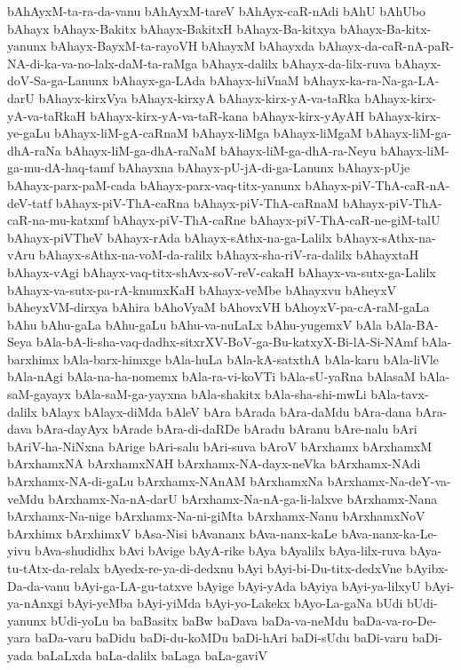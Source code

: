 {bAhAyxM-ta-ra-da-vanu
bAhAyxM-tareV
bAhAyx-caR-nAdi
bAhU
bAhUbo
bAhayx
bAhayx-Bakitx
bAhayx-BakitxH
bAhayx-Ba-kitxya
bAhayx-Ba-kitx-yanunx
bAhayx-BayxM-ta-rayoVH
bAhayxM
bAhayxda
bAhayx-da-caR-nA-paR-NA-di-ka-va-no-lalx-daM-ta-raMga
bAhayx-dalilx
bAhayx-da-lilx-ruva
bAhayx-doV-Sa-ga-Lanunx
bAhayx-ga-LAda
bAhayx-hiVnaM
bAhayx-ka-ra-Na-ga-LA-darU
bAhayx-kirxVya
bAhayx-kirxyA
bAhayx-kirx-yA-va-taRka
bAhayx-kirx-yA-va-taRkaH
bAhayx-kirx-yA-va-taR-kana
bAhayx-kirx-yAyAH
bAhayx-kirx-ye-gaLu
bAhayx-liM-gA-caRnaM
bAhayx-liMga
bAhayx-liMgaM
bAhayx-liM-ga-dhA-raNa
bAhayx-liM-ga-dhA-raNaM
bAhayx-liM-ga-dhA-ra-Neyu
bAhayx-liM-ga-mu-dA-haq-tamf
bAhayxna
bAhayx-pU-jA-di-ga-Lanunx
bAhayx-pUje
bAhayx-parx-paM-cada
bAhayx-parx-vaq-titx-yanunx
bAhayx-piV-ThA-caR-nA-deV-tatf
bAhayx-piV-ThA-caRna
bAhayx-piV-ThA-caRnaM
bAhayx-piV-ThA-caR-na-mu-katxmf
bAhayx-piV-ThA-caRne
bAhayx-piV-ThA-caR-ne-giM-talU
bAhayx-piVTheV
bAhayx-rAda
bAhayx-sAthx-na-ga-Lalilx
bAhayx-sAthx-na-vAru
bAhayx-sAthx-na-voM-da-ralilx
bAhayx-sha-riV-ra-dalilx
bAhayxtaH
bAhayx-vAgi
bAhayx-vaq-titx-shAvx-soV-reV-cakaH
bAhayx-va-sutx-ga-Lalilx
bAhayx-va-sutx-pa-rA-knumxKaH
bAhayx-veMbe
bAhayxvu
bAheyxV
bAheyxVM-dirxya
bAhira
bAhoVyaM
bAhovxVH
bAhoyxV-pa-cA-raM-gaLa
bAhu
bAhu-gaLa
bAhu-gaLu
bAhu-va-nuLaLx
bAhu-yugemxV
bAla
bAla-BA-Seya
bAla-bA-li-sha-vaq-dadhx-sitxrXV-BoV-ga-Bu-katxyX-Bi-lA-Si-NAmf
bAla-barxhimx
bAla-barx-himxge
bAla-huLa
bAla-kA-satxthA
bAla-karu
bAla-liVle
bAla-nAgi
bAla-na-ha-nomemx
bAla-ra-vi-koVTi
bAla-sU-yaRna
bAlasaM
bAla-saM-gayayx
bAla-saM-ga-yayxna
bAla-shakitx
bAla-sha-shi-mwLi
bAla-tavx-dalilx
bAlayx
bAlayx-diMda
bAleV
bAra
bArada
bAra-daMdu
bAra-dana
bAra-dava
bAra-dayAyx
bArade
bAra-di-daRDe
bAradu
bAranu
bAre-nalu
bAri
bAriV-ha-NiNxna
bArige
bAri-salu
bAri-suva
bAroV
bArxhamx
bArxhamxM
bArxhamxNA
bArxhamxNAH
bArxhamx-NA-dayx-neVka
bArxhamx-NAdi
bArxhamx-NA-di-gaLu
bArxhamx-NAnAM
bArxhamxNa
bArxhamx-Na-deY-va-veMdu
bArxhamx-Na-nA-darU
bArxhamx-Na-nA-ga-li-lalxve
bArxhamx-Nana
bArxhamx-Na-nige
bArxhamx-Na-ni-giMta
bArxhamx-Nanu
bArxhamxNoV
bArxhimx
bArxhimxV
bAsa-Nisi
bAvananx
bAva-nanx-kaLe
bAva-nanx-ka-Le-yivu
bAva-shudidhx
bAvi
bAvige
bAyA-rike
bAya
bAyalilx
bAya-lilx-ruva
bAya-tu-tAtx-da-relalx
bAyedx-re-ya-di-dedxnu
bAyi
bAyi-bi-Du-titx-dedxVne
bAyibx-Da-da-vanu
bAyi-ga-LA-gu-tatxve
bAyige
bAyi-yAda
bAyiya
bAyi-ya-lilxyU
bAyi-ya-nAnxgi
bAyi-yeMba
bAyi-yiMda
bAyi-yo-Lakekx
bAyo-La-gaNa
bUdi
bUdi-yanunx
bUdi-yoLu
ba
baBasitx
baBw
baDava
baDa-va-neMdu
baDa-va-ro-De-yara
baDa-varu
baDidu
baDi-du-koMDu
baDi-hAri
baDi-sUdu
baDi-varu
baDi-yada
baLaLxda
baLa-dalilx
baLaga
baLa-gaviV
}
